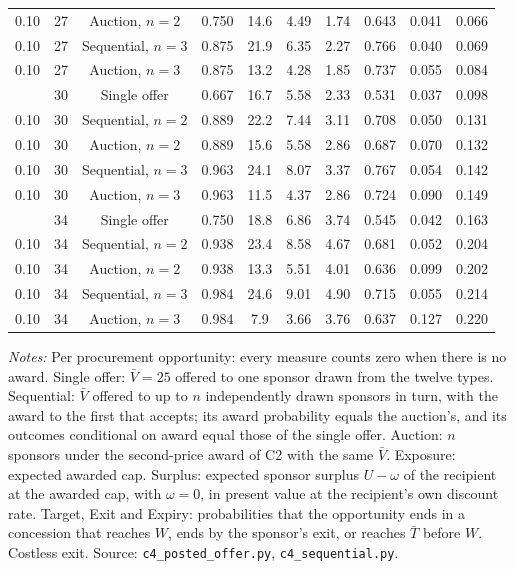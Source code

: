 \begin{table}[htbp]
{\begin{tabular}{cccccccccc}
0.10 & 27 & Auction, $n = 2$ & 0.750 & 14.6 & 4.49 & 1.74 & 0.643 & 0.041 & 0.066\\
0.10 & 27 & Sequential, $n = 3$ & 0.875 & 21.9 & 6.35 & 2.27 & 0.766 & 0.040 & 0.069\\
0.10 & 27 & Auction, $n = 3$ & 0.875 & 13.2 & 4.28 & 1.85 & 0.737 & 0.055 & 0.084\\
\addlinespace
0.10 & 30 & Single offer & 0.667 & 16.7 & 5.58 & 2.33 & 0.531 & 0.037 & 0.098\\
0.10 & 30 & Sequential, $n = 2$ & 0.889 & 22.2 & 7.44 & 3.11 & 0.708 & 0.050 & 0.131\\
0.10 & 30 & Auction, $n = 2$ & 0.889 & 15.6 & 5.58 & 2.86 & 0.687 & 0.070 & 0.132\\
0.10 & 30 & Sequential, $n = 3$ & 0.963 & 24.1 & 8.07 & 3.37 & 0.767 & 0.054 & 0.142\\
0.10 & 30 & Auction, $n = 3$ & 0.963 & 11.5 & 4.37 & 2.86 & 0.724 & 0.090 & 0.149\\
\addlinespace
0.10 & 34 & Single offer & 0.750 & 18.8 & 6.86 & 3.74 & 0.545 & 0.042 & 0.163\\
0.10 & 34 & Sequential, $n = 2$ & 0.938 & 23.4 & 8.58 & 4.67 & 0.681 & 0.052 & 0.204\\
0.10 & 34 & Auction, $n = 2$ & 0.938 & 13.3 & 5.51 & 4.01 & 0.636 & 0.099 & 0.202\\
0.10 & 34 & Sequential, $n = 3$ & 0.984 & 24.6 & 9.01 & 4.90 & 0.715 & 0.055 & 0.214\\
0.10 & 34 & Auction, $n = 3$ & 0.984 & 7.9 & 3.66 & 3.76 & 0.637 & 0.127 & 0.220\\
\bottomrule\end{tabular}}
\par\smallskip\begin{minipage}{\textwidth}\footnotesize\textit{Notes:} Per procurement opportunity: every measure counts zero when there is no award. Single offer: $\bar V = 25$ offered to one sponsor drawn from the twelve types. Sequential: $\bar V$ offered to up to $n$ independently drawn sponsors in turn, with the award to the first that accepts; its award probability equals the auction's, and its outcomes conditional on award equal those of the single offer. Auction: $n$ sponsors under the second-price award of C2 with the same $\bar V$. Exposure: expected awarded cap. Surplus: expected sponsor surplus $U - \omega$ of the recipient at the awarded cap, with $\omega = 0$, in present value at the recipient's own discount rate. Target, Exit and Expiry: probabilities that the opportunity ends in a concession that reaches $W$, ends by the sponsor's exit, or reaches $\bar T$ before $W$. Costless exit. Source: \texttt{c4\_posted\_offer.py}, \texttt{c4\_sequential.py}.\end{minipage}
\end{table}

